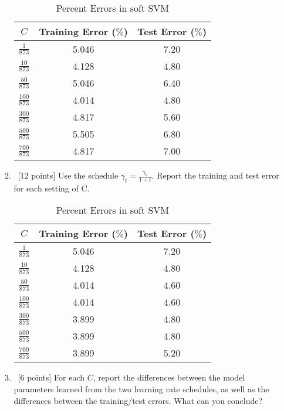 \documentclass[12pt, fullpage,letterpaper]{article}
\begin{document}
\begin{enumerate}
\begin{enumerate}
	\begin{table}[h]
		\centering
		\begin{tabular}{c|cc}
			$C$ & {Training Error ($\%$)} &  {Test Error ($\%$)}\\ 
			\hline\hline
			$\frac{1}{873}$ & 5.046 & 7.20 \\ \hline
			$\frac{10}{873}$ & 4.128 & 4.80 \\ \hline
			$\frac{50}{873}$ & 5.046 & 6.40 \\ \hline
			$\frac{100}{873}$ & 4.014 & 4.80 \\ \hline
			$\frac{300}{873}$ & 4.817 & 5.60 \\ \hline
			$\frac{500}{873}$ & 5.505 & 6.80 \\ \hline
			$\frac{700}{873}$ & 4.817 & 7.00 \\ \hline
			\end{tabular}
		\caption{Percent Errors in soft SVM}
	\end{table}
	
	
		
		\item~[12 points] Use the schedule $\gamma_t = \frac{\gamma_0}{1+t}$. Report the training and test error for each setting of C. 
		
		
		\begin{table}[h]
		\centering
		\begin{tabular}{c|cc}
			$C$ & {Training Error ($\%$)} &  {Test Error ($\%$)}\\ 
			\hline\hline
			$\frac{1}{873}$ & 5.046 & 7.20 \\ \hline
			$\frac{10}{873}$ & 4.128 & 4.80 \\ \hline
			$\frac{50}{873}$ & 4.014 & 4.60 \\ \hline
			$\frac{100}{873}$ & 4.014 & 4.60 \\ \hline
			$\frac{300}{873}$ & 3.899 & 4.80 \\ \hline
			$\frac{500}{873}$ & 3.899 & 4.80 \\ \hline
			$\frac{700}{873}$ & 3.899 & 5.20 \\ \hline
			\end{tabular}
		\caption{Percent Errors in soft SVM}
	\end{table}
		
		
		\item~[6 points] For each $C$, report the differences between the model parameters learned from the two learning rate schedules, as well as the differences between the training/test errors. What can you conclude? 
	\end{enumerate}
	

\end{enumerate}
\end{document}

